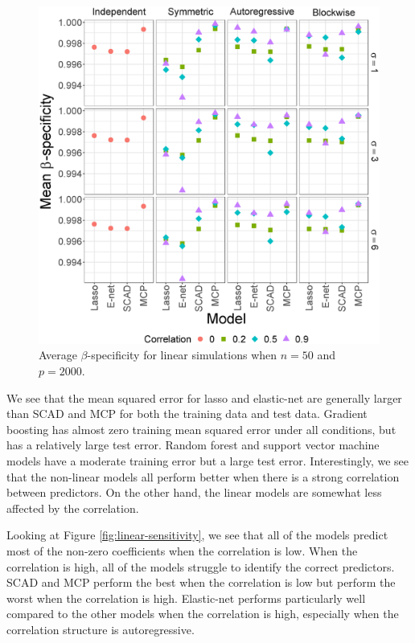 \documentclass{article}
\begin{document}
\begin{figure}[t!]
\begin{minipage}[t]{0.47\textwidth}
			\includegraphics[width = \textwidth]{images/facet/publication_facet_specificity_1_50_2000.eps}
			\captionsetup{width = 0.95\textwidth}
			\caption{Average $\beta$-specificity for linear simulations when $n = 50$ and $p = 	2000$.}
			\label{fig:linear-specificity}
		\end{minipage}
	\end{figure}

	We see that the mean squared error for lasso and elastic-net are generally larger than SCAD and MCP for both the training data and test data. Gradient boosting has almost zero training mean squared error under all conditions, but has a relatively large test error. Random forest and support vector machine models have a moderate training error but a large test error. Interestingly, we see that the non-linear models all perform better when there is a strong correlation between predictors. On the other hand, the linear models are somewhat less affected by the correlation.
	
	Looking at Figure \ref{fig:linear-sensitivity}, we see that all of the models predict most of the non-zero coefficients when the correlation is low. When the correlation is high, all of the models struggle to identify the correct predictors. SCAD and MCP perform the best when the correlation is low but perform the worst when the correlation is high. Elastic-net performs particularly well compared to the other models when the correlation is high, especially when the correlation structure is autoregressive.
	
\end{document}
